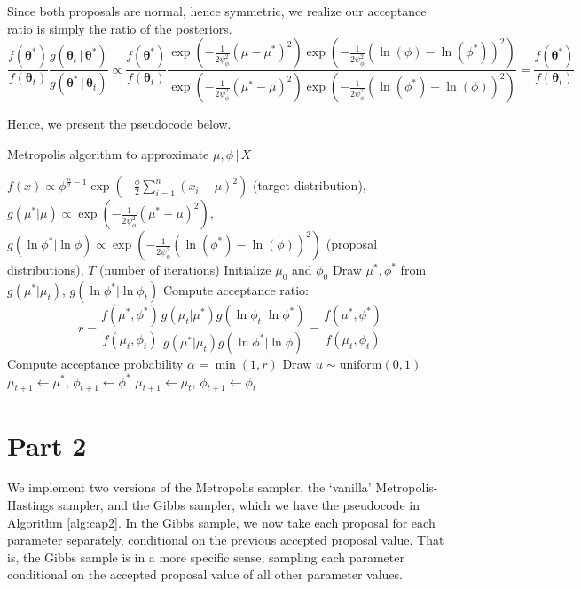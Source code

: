 \documentclass[12pt]{article}
\begin{document}
Since both proposals are normal, hence symmetric, we realize our acceptance ratio is simply the ratio of the posteriors.
\[\frac{f(\bm\theta^\ast)}{f(\bm\theta_t)}\frac{g(\bm\theta_t\,|\,\bm\theta^\ast)}{g(\bm\theta^\ast\,|\,\bm\theta_t)}\propto\frac{f(\bm\theta^\ast)}{f(\bm\theta_t)}\frac{\exp\left(-\frac{1}{2\psi_\phi^2}(\mu-\mu^\ast)^2\right)\exp\left(-\frac{1}{2\psi_\phi^2}(\ln(\phi)-\ln(\phi^\ast))^2\right)}{\exp\left(-\frac{1}{2\psi_\phi^2}(\mu^\ast-\mu)^2\right)\exp\left(-\frac{1}{2\psi_\phi^2}(\ln(\phi^\ast)-\ln(\phi))^2\right)}=\frac{f(\bm\theta^\ast)}{f(\bm\theta_t)}
\]

Hence, we present the pseudocode below.
\begin{algorithm}[H]
\caption{Metropolis algorithm to approximate \(\mu,\phi\,|\,X\)}\label{alg:cap}
\begin{algorithmic}[1]
\Require \(f(x)\propto\phi^{\frac{n}{2}-1}\exp\left(-\frac{\phi}{2}\sum_{i=1}^n(x_i-\mu)^2\right)\) (target distribution), \(g(\mu^\ast|\mu)\propto\exp\left(-\frac{1}{2\psi_\phi^2}(\mu^\ast-\mu)^2\right)\), \(g(\ln\phi^\ast|\ln\phi)\propto\exp\left(-\frac{1}{2\psi_\phi^2}(\ln(\phi^\ast)-\ln(\phi))^2\right)\) (proposal distributions), \(T\) (number of iterations)
\State Initialize \(\mu_0\) and \(\phi_0\)
    \State Draw \(\mu^\ast,\phi^\ast\) from \(g(\mu^\ast|\mu_t)\), \(g(\ln\phi^\ast|\ln\phi_t)\)
    \State Compute acceptance ratio:
    \[r=\frac{f(\mu^\ast,\phi^\ast)}{f(\mu_t,\phi_t)}\frac{g(\mu_t|\mu^\ast)g(\ln\phi_t|\ln\phi^\ast)}{g(\mu^\ast|\mu_t)g(\ln\phi^\ast|\ln\phi)}=\frac{f(\mu^\ast,\phi^\ast)}{f(\mu_t,\phi_t)}\]
    \State Compute acceptance probability \(\alpha=\min(1, r)\)
    \State Draw \(u\sim\text{uniform}(0,1)\)
        \State \(\mu_{t+1}\gets\mu^\ast\), \(\phi_{t+1}\gets\phi^\ast\)
        \State \(\mu_{t+1}\gets\mu_t\), \(\phi_{t+1}\gets\phi_t\)
    \EndIf
\EndFor
\end{algorithmic}
\end{algorithm}

\section*{Part 2}

We implement two versions of the Metropolis sampler, the `vanilla' Metropolis-Hastings sampler, and the Gibbs sampler, which we have the pseudocode in Algorithm \ref{alg:cap2}. In the Gibbs sample, we now take each proposal for each parameter separately, conditional on the previous accepted proposal value. That is, the Gibbs sample is in a more specific sense, sampling each parameter conditional on the accepted proposal value of all other parameter values.
\end{document}
